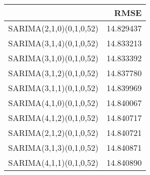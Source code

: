 \begin{tabular}{lr}
\toprule
 & RMSE \\
\midrule
SARIMA(2,1,0)(0,1,0,52) & 14.829437 \\
SARIMA(3,1,4)(0,1,0,52) & 14.833213 \\
SARIMA(3,1,0)(0,1,0,52) & 14.833392 \\
SARIMA(3,1,2)(0,1,0,52) & 14.837780 \\
SARIMA(3,1,1)(0,1,0,52) & 14.839969 \\
SARIMA(4,1,0)(0,1,0,52) & 14.840067 \\
SARIMA(4,1,2)(0,1,0,52) & 14.840717 \\
SARIMA(2,1,2)(0,1,0,52) & 14.840721 \\
SARIMA(3,1,3)(0,1,0,52) & 14.840871 \\
SARIMA(4,1,1)(0,1,0,52) & 14.840890 \\
\bottomrule
\end{tabular}
